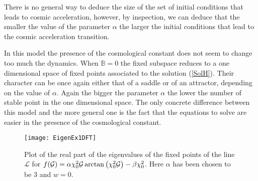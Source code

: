 \documentclass[a4paper,aps,onecolumn,nofootinbib]{revtex4}
\def\rf#1{(\ref{#1})}
\def\G{{\cal G}}
\begin{document}
There is no general way to deduce the size of the set of initial conditions that leads to cosmic acceleration, however, by inspection, we can deduce that the smaller the value of the parameter $\alpha$ the larger the initial conditions that lead to the cosmic acceleration transition.

In this model the presence of the  cosmological constant does not seem to change too much the dynamics. When $\mathbb{B}=0$ the fixed subspace reduces to a one dimensional space of fixed points associated to the solution \rf{SolH}. Their character can be once again  either  that of a saddle or  of an attractor, depending on the value of $\alpha$. Again the bigger the parameter $\alpha$ the lower the number of stable point in the one dimensional space. The only concrete difference between this model and the more general one is the fact that the equations to solve are easier in the presence of the cosmological constant.
\begin{figure}[htbp]
\begin{center}
\texttt{[image: EigenEx1DFT]}
\caption{Plot of the real part of the eigenvalues of the fixed points of the line $\mathcal{L}$ for $f(\G)= \alpha \chi_0^2 \G \arctan\left(\chi_0^2 \G\right)-\beta \chi_0^2$. Here $\alpha$ has been chosen to be $3$ and $w=0$. }
\label{EigenEx1DFT}
\end{center}
\end{figure}
\end{document}
